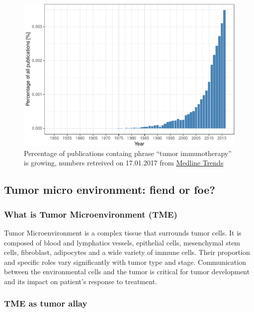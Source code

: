 \documentclass[12pt,]{book}
\theoremstyle{definition}
\theoremstyle{definition}
\theoremstyle{definition}
\theoremstyle{remark}
\begin{document}
\begin{figure}

{\centering \includegraphics[width=0.7\linewidth]{UCzPhDThesis_files/figure-latex/pubmedTME-1} 

}

\caption{Percentage of publications containg phrase
``tumor immunotherapy'' is growing, numbers retreived on 17.01.2017 from
\href{http://dan.corlan.net/medline-trend.html}{Medline Trends}
\citet{REF}}\label{fig:pubmedTME}
\end{figure}






\hypertarget{tumor-micro-environment-fiend-or-foe}{%
\subsection{Tumor micro environment: fiend or
foe?}\label{tumor-micro-environment-fiend-or-foe}}

\hypertarget{what-is-tumor-microenvironment-tme}{%
\subsubsection{What is Tumor Microenvironment
(TME)}\label{what-is-tumor-microenvironment-tme}}

Tumor Microenvironment is a complex tissue that surrounds tumor cells.
It is composed of blood and lymphatics vessels, epithelial cells,
mesenchymal stem cells, fibroblast, adipocytes and a wide variety of
immune cells. Their proportion and specific roles vary significantly
with tumor type and stage. Communication between the environmental cells
and the tumor is critical for tumor development and its impact on
patient's response to treatment.

\hypertarget{tme-as-tumor-allay}{%
\subsubsection{TME as tumor allay}\label{tme-as-tumor-allay}}
\end{document}
